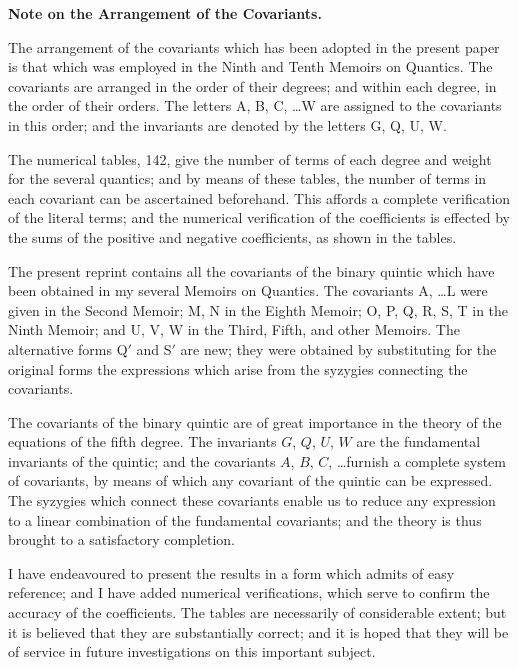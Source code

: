 \documentclass[11pt,a4paper]{article}
\begin{document}
\clearpage
\setcounter{page}{300}

\begin{center}
\textbf{Note on the Arrangement of the Covariants.}
\end{center}

The arrangement of the covariants which has been adopted in the present paper is that which was employed in the Ninth and Tenth Memoirs on Quantics. The covariants are arranged in the order of their degrees; and within each degree, in the order of their orders. The letters A, B, C, \ldots W are assigned to the covariants in this order; and the invariants are denoted by the letters G, Q, U, W.

The numerical tables, 142, give the number of terms of each degree and weight for the several quantics; and by means of these tables, the number of terms in each covariant can be ascertained beforehand. This affords a complete verification of the literal terms; and the numerical verification of the coefficients is effected by the sums of the positive and negative coefficients, as shown in the tables.

The present reprint contains all the covariants of the binary quintic which have been obtained in my several Memoirs on Quantics. The covariants A, \ldots L were given in the Second Memoir; M, N in the Eighth Memoir; O, P, Q, R, S, T in the Ninth Memoir; and U, V, W in the Third, Fifth, and other Memoirs. The alternative forms Q$'$ and S$'$ are new; they were obtained by substituting for the original forms the expressions which arise from the syzygies connecting the covariants.

\clearpage
\setcounter{page}{301}

The covariants of the binary quintic are of great importance in the theory of the equations of the fifth degree. The invariants $G$, $Q$, $U$, $W$ are the fundamental invariants of the quintic; and the covariants $A$, $B$, $C$, \ldots furnish a complete system of covariants, by means of which any covariant of the quintic can be expressed. The syzygies which connect these covariants enable us to reduce any expression to a linear combination of the fundamental covariants; and the theory is thus brought to a satisfactory completion.

I have endeavoured to present the results in a form which admits of easy reference; and I have added numerical verifications, which serve to confirm the accuracy of the coefficients. The tables are necessarily of considerable extent; but it is believed that they are substantially correct; and it is hoped that they will be of service in future investigations on this important subject.
\end{document}
